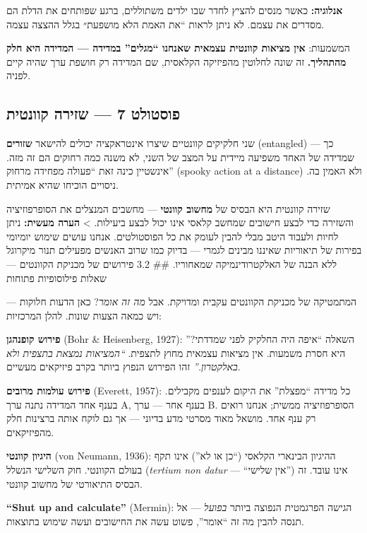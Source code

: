 \documentclass[
  hebrew,
  letterpaper,
  DIV=11,
  numbers=noendperiod]{scrreprt}
\begin{document}
\textbf{אנלוגיה:} כאשר מנסים להציץ לחדר שבו ילדים משתוללים, ברגע שפותחים
את הדלת הם מסדרים את עצמם. לא ניתן לראות ``את האמת הלא מושפעת״ בגלל
ההצצה עצמה.

המשמעות: \textbf{אין מציאות קוונטית עצמאית שאנחנו ``מגלים'' במדידה ---
המדידה היא חלק מהתהליך.} זה שונה לחלוטין מהפיזיקה הקלאסית, שם המדידה רק
חושפת ערך שהיה קיים לפניה.

\subsection{פוסטולט 7 --- שזירה
קוונטית}\label{ux5e4ux5d5ux5e1ux5d8ux5d5ux5dcux5d8-7-ux5e9ux5d6ux5d9ux5e8ux5d4-ux5e7ux5d5ux5d5ux5e0ux5d8ux5d9ux5ea}

שני חלקיקים קוונטיים שיצרו אינטראקציה יכולים להישאר \textbf{שזורים}
(entangled) --- כך שמדידה של האחד משפיעה מיידית על המצב של השני, לא משנה
כמה רחוקים הם זה מזה. אינשטיין כינה זאת ``פעולה מפחידה מרחוק'' (spooky
action at a distance) ולא האמין בה. ניסויים הוכיחו שהיא אמיתית.

שזירה קוונטית היא הבסיס של \textbf{מחשוב קוונטי} --- מחשבים המנצלים את
הסופרפוזיציה והשזירה כדי לבצע חישובים שמחשב קלאסי אינו יכול לבצע
ביעילות. \textgreater{} \textbf{הערה מעשית:} ניתן לחיות ולעבוד היטב מבלי
להבין לעומק את כל הפוסטולטים. אנחנו עושים שימוש יומיומי בפירות של
תיאוריות שאיננו מבינים לגמרי --- בדיוק כמו שרוב האנשים מפעילים תנור
מיקרוגל ללא הבנה של האלקטרודינמיקה שמאחוריו. \#\# 3.2 פירושים של מכניקת
הקוונטים --- שאלות פילוסופיות פתוחות

המתמטיקה של מכניקת הקוונטים עקבית ומדויקת. אבל \emph{מה זה אומר}? כאן
הדעות חלוקות --- ויש כמאה הצעות שונות. להלן המרכזיות:

\textbf{פירוש קופנהגן} (Bohr \& Heisenberg, 1927): השאלה ``איפה היה
החלקיק לפני שמדדתי?'' היא חסרת משמעות. אין מציאות עצמאית מחוץ לתצפית.
\emph{``המציאות נמצאת בתצפית ולא באלקטרון.''} זהו הפירוש הנפוץ ביותר
בקרב פיזיקאים מעשיים.

\textbf{פירוש עולמות מרובים} (Everett, 1957): כל מדידה ``מפצלת'' את
היקום לענפים מקבילים. בענף אחד המדידה נתנה ערך A, בענף אחר --- ערך B.
הסופרפוזיציה ממשית; אנחנו רואים רק ענף אחד. מושאל מאוד מסרטי מדע בדיוני
--- אך גם לוקח אותה ברצינות חלק מהפיזיקאים.

\textbf{היגיון קוונטי} (von Neumann, 1936): ההיגיון הבינארי הקלאסי (``כן
או לא'') אינו תקף בעולם הקוונטי. חוק השלישי הנשלל (\emph{tertium non
datur} --- ``אין שלישי'') אינו עובד. זה הבסיס התיאורטי של מחשוב קוונטי.

\textbf{``Shut up and calculate''} (Mermin): הגישה הפרגמטית הנפוצה ביותר
\emph{בפועל} --- אל תנסה להבין מה זה ``אומר'', פשוט עשה את החישובים ועשה
שימוש בתוצאות.
\end{document}
